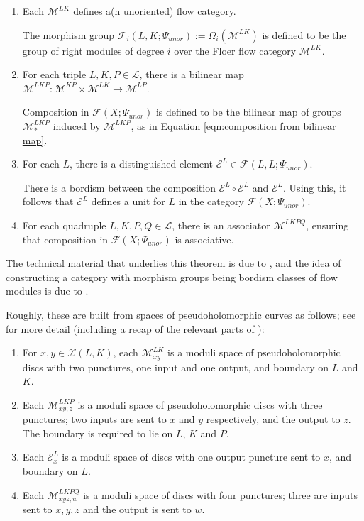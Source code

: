 \documentclass{TPmod}
\newcommand{\cE}{\mathcal{E}}
\newcommand{\cF}{\mathcal{F}}
\newcommand{\cL}{\mathcal{L}}
\newcommand{\cM}{\mathcal{M}}
\newcommand{\cX}{\mathcal{X}}
\numberwithin{equation}{section}
\begin{document}
    \begin{thmdef}\label{thmdef:unor fuk}
        \begin{enumerate}
            \item Each $\cM^{LK}$ defines a(n unoriented) flow category.

            The morphism group $\cF_i(L,K;\Psi_{unor}) := \Omega_i(\cM^{LK})$ is defined to be the group of right modules of degree $i$ over the Floer flow category $\cM^{LK}$.
            \item For each triple $L,K,P \in \cL$, there is a bilinear map $\cM^{LKP}: \cM^{KP} \times \cM^{LK} \to \cM^{LP}$.

            Composition in $\cF(X; \Psi_{unor})$ is defined to be the bilinear map of groups $\cM^{LKP}_*$ induced by $\cM^{LKP}$, as in Equation \ref{eqn:composition from bilinear map}.
            \item For each $L$, there is a distinguished element $\cE^L \in \cF(L,L; \Psi_{unor})$. 

            There is a bordism between the composition $\cE^L \circ \cE^L$ and $\cE^L$. Using this, it follows \cite[Section 7.5]{PS} that $\cE^L$ defines a unit for $L$ in the category $\cF(X; \Psi_{unor})$.
            \item For each quadruple $L,K,P,Q \in \cL$, there is an associator $\cM^{LKPQ}$, ensuring that composition in $\cF(X; \Psi_{unor})$ is associative.
        \end{enumerate}
        
    \end{thmdef}
    The technical material that underlies this theorem is due to \cite{Large,FO3:smoothness}, and the idea of constructing a category with morphism groups being bordism classes of flow modules is due to \cite{AB2}.
    
    Roughly, these are built from spaces of pseudoholomorphic curves as follows; see \cite[Section 7]{PS} for more detail (including a recap of the relevant parts of \cite{Large,FO3:smoothness}):
    \begin{enumerate}
        \item For $x,y \in \cX(L,K)$, each $\cM^{LK}_{xy}$ is a moduli space of pseudoholomorphic discs with two punctures, one input and one output, and boundary on $L$ and $K$.
        \item Each $\cM^{LKP}_{xy;z}$ is a moduli space of pseudoholomorphic discs with three punctures; two inputs are sent to $x$ and $y$ respectively, and the output to $z$. The boundary is required to lie on $L$, $K$ and $P$.
        \item Each $\cE^L_x$ is a moduli space of discs with one output puncture sent to $x$, and boundary on $L$.
        \item Each $\cM^{LKPQ}_{xyz;w}$ is a moduli space of discs with four punctures; three are inputs sent to $x,y,z$ and the output is sent to $w$. 
    \end{enumerate}
\end{document}
